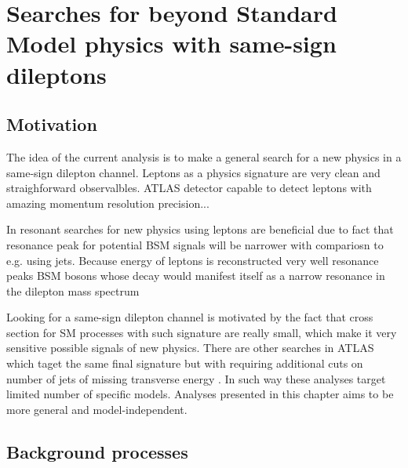 \chapter{Searches for beyond Standard Model physics with same-sign dileptons}
\label{chap:SS}
\section{Motivation}

The idea of the current analysis is to make a general search for a new physics in a same-sign dilepton channel. \toFix
Leptons as a physics signature are very clean and straighforward observalbles. 
ATLAS detector capable to detect leptons with amazing momentum resolution precision... 

In resonant searches for new physics using leptons are beneficial due to fact that resonance peak for potential BSM signals will be narrower with compariosn to e.g. using jets.
Because energy of leptons is reconstructed very well resonance peaks 
BSM bosons whose decay would manifest itself as a narrow resonance in the dilepton mass spectrum

Looking for a same-sign dilepton channel is motivated by the fact that cross section for SM processes with such signature are really small, which make 
it very sensitive possible signals of new physics.  \toFix
There are other searches in ATLAS which taget the same final signature but with requiring additional cuts on number of jets \toFix[link] of missing transverse energy \toFix[link].
In such way these analyses target limited number of specific models.
Analyses presented in this chapter aims to be more general and model-independent. 

\section{Background processes}
\label{sec:wprimeBackgrounds}


